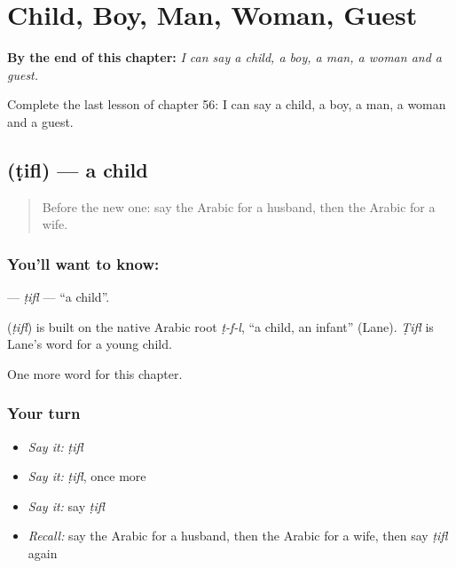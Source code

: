 
\chapter{Child, Boy, Man, Woman, Guest}
\label{ch:ar-child-boy-man-woman-guest}

\begin{chapteropening}
\textbf{By the end of this chapter:} \emph{I can say a child, a boy, a man, a woman and a guest.}

Complete the last lesson of chapter 56: I can say a child, a boy, a man, a woman and a guest.
\end{chapteropening}

\section[\texorpdfstring{\ar{طفل} (ṭifl)}{طفل (ṭifl)}]{ (ṭifl) — a child}

\label{lesson:AR-C56-tifl}



\begin{quote}
Before the new one: say the Arabic for a husband, then the Arabic for a wife.
\end{quote}

\subsection*{You'll want to know: }
\textbf{} — \emph{ṭifl} — \textquotedblleft{}a child\textquotedblright{}.

\begin{cousinweb}
\textbf{} (\emph{ṭifl}) is built on the native Arabic root \emph{ṭ-f-l}, \textquotedblleft{}a child, an infant\textquotedblright{} (Lane). \emph{Ṭifl} is Lane's word for a young child.
\end{cousinweb}

\begin{grammarlens}[title={What you've built}]
One more word for this chapter.
\end{grammarlens}

\subsection*{Your turn}
\begin{itemize}
\raggedright
  \item \emph{Say it:} \emph{ṭifl}
  \item \emph{Say it:} \emph{ṭifl}, once more
  \item \emph{Say it:} say \emph{ṭifl}
  \item \emph{Recall:} say the Arabic for a husband, then the Arabic for a wife, then say \emph{ṭifl} again
\end{itemize}

